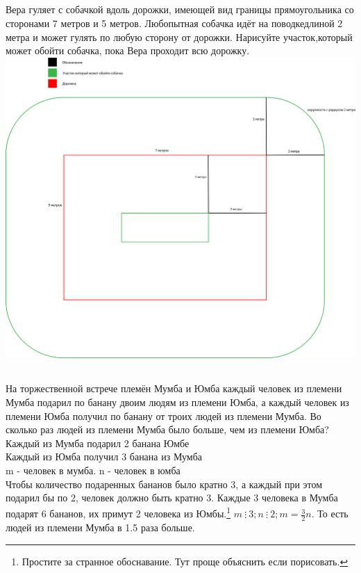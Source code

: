 \documentclass[a4paper,12pt]{article} %
\begin{document}
	\subsection{}{Вера гуляет с собачкой вдоль дорожки, имеющей вид границы прямоугольника со сторонами 7 метров и 5 метров. Любопытная собачка идёт на поводкедлиной 2 метра и может гулять по любую сторону от дорожки. Нарисуйте участок,который может обойти собачка, пока Вера проходит всю дорожку.\\
		\includegraphics[scale=0.3]{"Задача 3"}
	}
	\subsection{}{На торжественной встрече племён Мумба и Юмба каждый человек из племени Мумба подарил по банану двоим людям из племени Юмба, а каждый человек из племени Юмба получил по банану от троих людей из племени Мумба. Во сколько раз людей из племени Мумба было больше, чем из племени Юмба?\\
		
		Каждый из Мумба подарил 2 банана Юмбе\\
		Каждый из Юмба получил 3 банана из Мумба\\
		m - человек в мумба. n - человек в юмба\\
		Чтобы количество подаренных бананов было кратно 3, а каждый при этом подарил бы по 2, человек должно быть кратно 3. Каждые 3 человека в Мумба подарят 6 бананов, их примут 2 человека из Юмбы.\footnote{Простите за странное обоснавание. Тут проще объяснить если порисовать.} $m~\vdots~3; n~\vdots~2; m = \frac{3}{2}n$. То есть людей из племени Мумба в 1.5 раза больше.
	}
\end{document}

